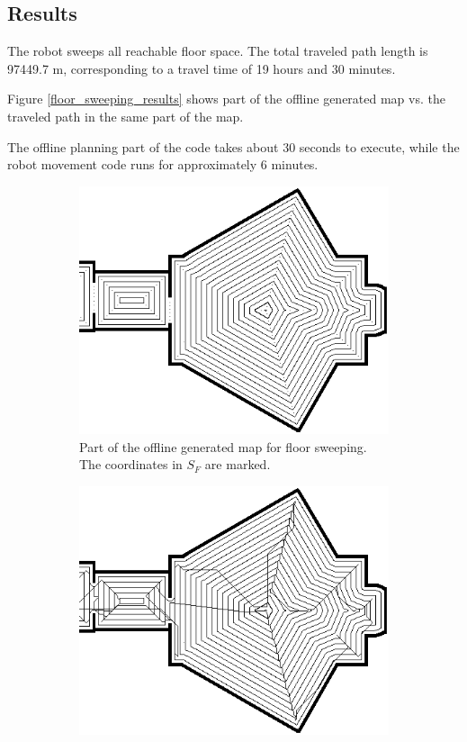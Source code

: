 \subsection{Results}
The robot sweeps all reachable floor space.
The total traveled path length is 97449.7 m, corresponding to a travel time of 19 hours and 30 minutes.

Figure \ref{floor_sweeping_results} shows part of the offline generated map vs. the traveled path in the same part of the map.

The offline planning part of the code takes about 30 seconds to execute,
while the robot movement code runs for approximately 6 minutes.

\begin{figure}[ht]
\centering
  \begin{subfigure}[t]{0.3\textwidth}
    \includegraphics[width = \textwidth]{graphics/floor_sweep_plan}
    \caption{Part of the offline generated map for floor sweeping. The coordinates in \(S_{F}\) are marked.}
    \label{floor_sweep_plan}
  \end{subfigure}
  \begin{subfigure}[t]{0.3\textwidth}
    \includegraphics[width = \textwidth]{graphics/floor_sweep_robot}

\end{subfigure}
\end{figure}
